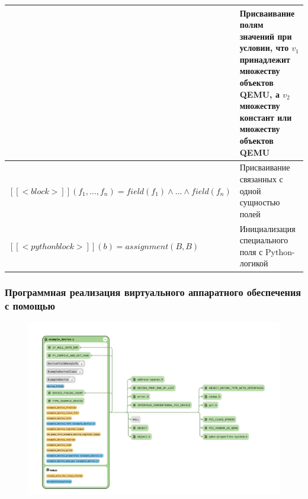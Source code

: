 \begin{frame}[allowframebreaks]
{\begin{longtable}{| p{6cm} | p{5cm} |}
            & Присваивание полям значений при условии, что $v_1$
            принадлежит множеству объектов QEMU, а $v_2$ множеству
            констант или множеству объектов QEMU \\
            \hline
            $[[<block>]](f_1,...,f_n) = field(f_1) \land ... \land field(f_n)$
            & Присваивание связанных с одной сущностью полей \\
            \hline
            $[[<python block>]](b) = assignment(B,B)$
            & Инициализация специального поля с Python-логикой\\
            \hline
        \end{longtable}
    }
\end{frame}%


\begin{frame}%
    \frametitle{Программная реализация виртуального аппаратного обеспечения с помощью {\mylanguage}}
    \begin{figure}[!htbp]
        \begin{adjustbox}{max totalsize={\textwidth}{\textheight}}
            \includegraphics[]{images/experimental-device-class-diag.png}
        \end{adjustbox}
    \end{figure}
\end{frame}



